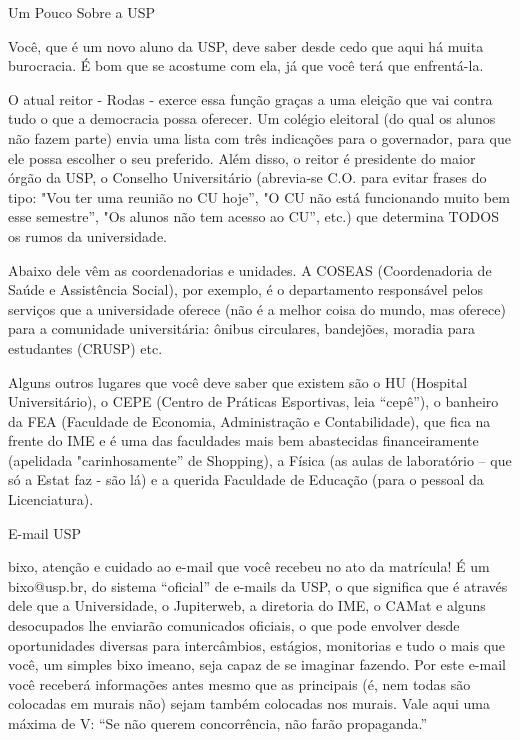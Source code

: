 \begin{secao}{Um Pouco Sobre a USP}

Você, que é um novo aluno da USP, deve saber desde cedo que aqui há muita burocracia. É bom que se acostume com ela, já que você terá que enfrentá-la. 

O atual reitor - Rodas - exerce essa função graças a uma eleição que vai contra tudo o que a democracia possa oferecer. Um colégio eleitoral (do qual os alunos não fazem parte) envia uma lista com três indicações para o governador, para que ele possa escolher o seu preferido. Além disso, o reitor é presidente do maior órgão da USP, o Conselho Universitário (abrevia-se C.O. para evitar frases do tipo: "Vou ter uma reunião no CU hoje”, "O CU não está funcionando muito bem esse semestre”, "Os alunos não tem acesso ao CU”, etc.) que determina TODOS os rumos da universidade.

Abaixo dele vêm as coordenadorias e unidades. A COSEAS (Coordenadoria de Saúde e Assistência Social), por exemplo, é o departamento responsável pelos serviços que a universidade oferece (não é a melhor coisa do mundo, mas oferece) para a comunidade universitária: ônibus circulares, bandejões, moradia para estudantes (CRUSP) etc.

Alguns outros lugares que você deve saber que existem são o HU (Hospital Universitário), o CEPE (Centro de Práticas Esportivas, leia “cepê”), o banheiro da FEA (Faculdade de Economia, Administração e Contabilidade), que fica na frente do IME e é uma das faculdades mais bem abastecidas financeiramente (apelidada "carinhosamente” de Shopping), a Física (as aulas de laboratório – que só a Estat faz - são lá) e a querida Faculdade de Educação (para o pessoal da Licenciatura).

\begin{subsecao}{E-mail USP}

bixo, atenção e cuidado ao e-mail que você recebeu no ato da matrícula! É um bixo@usp.br, do sistema “oficial” de e-mails da USP, o que significa que é através dele que a Universidade, o Jupiterweb, a diretoria do IME, o CAMat e alguns desocupados lhe enviarão comunicados oficiais, o que pode envolver desde oportunidades diversas para intercâmbios, estágios, monitorias e tudo o mais que você, um simples bixo imeano, seja capaz de se imaginar fazendo. Por este e-mail você receberá informações antes mesmo que as principais (é, nem todas são colocadas em murais não) sejam também colocadas nos murais. Vale aqui uma máxima de V: “Se não querem concorrência, não farão propaganda.” 


\end{subsecao}
\end{secao}
